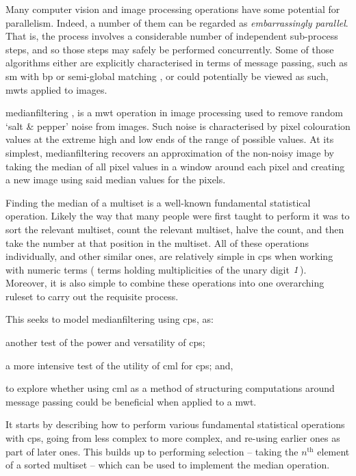 Many computer vision and image processing operations have some potential for parallelism.  Indeed, a number of them can be regarded as \emph{embarrassingly parallel}.  That is, the process involves a considerable number of independent sub-process steps, and so those steps may safely be performed concurrently.  Some of those algorithms either are explicitly characterised in terms of message passing, such as \gls{sm} with \gls{bp} \cite{Liang2011} or semi-global matching \cite{Drory2014}, or could potentially be viewed as such, \eg{} \glspl{mwt} applied to images.

\Gls{medianfilter}ing \cite[Chap. 3.4.1]{Gimelfarb2018}, \cite{Fisher2016} is a \gls{mwt} operation in image processing used to remove random `salt \& pepper' noise from images.  Such noise is characterised by pixel colouration values at the extreme high and low ends of the range of possible values.  At its simplest, \gls{medianfilter}ing recovers an approximation of the non-noisy image by taking the median of all pixel values in a window around each pixel and creating a new image using said median values for the pixels.

Finding the median of a multiset is a well-known fundamental statistical operation.  Likely the way that many people were first taught to perform it was to sort the relevant multiset, count the relevant multiset, halve the count, and then take the number at that position in the multiset.  All of these operations individually, and other similar ones, are relatively simple in \gls{cps} when working with numeric terms (\ie{} terms holding multiplicities of the unary digit \(\mathit{1}\)).  Moreover, it is also simple to combine these operations into one overarching \gls{ruleset} to carry out the requisite process.

This  seeks to model \gls{medianfilter}ing using \gls{cps}, as:
\begin{inparaenum}[a)]
\item  another test of the power and versatility of \gls{cps};
\item a more intensive test of the utility of \gls{cml} for \gls{cps}; and,
\item to explore whether using \gls{cml} as a method of structuring computations around message passing could be beneficial when applied to a \gls{mwt}.
\end{inparaenum}
It starts by describing how to perform various fundamental statistical operations with \gls{cps}, going from less complex to more complex, and re-using earlier ones as part of later ones.  This builds up to performing selection -- taking the \(n^{\text{th}}\) element of a sorted multiset -- which can be used to implement the median operation.

